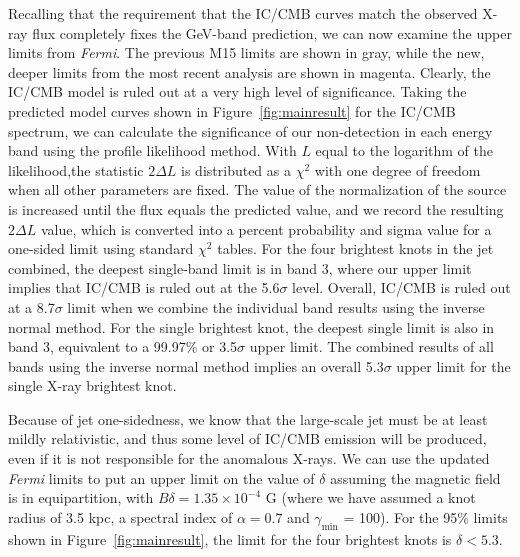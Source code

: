 \documentclass[twocolumn]{aastex61}
\begin{document}
Recalling that the requirement that the IC/CMB curves match the
observed X-ray flux completely fixes the GeV-band prediction, we can
now examine the upper limits from \emph{Fermi}. The previous M15
limits are shown in gray, while the new, deeper limits from the most
recent analysis are shown in magenta. Clearly, the IC/CMB model is
ruled out at a very high level of significance. Taking the predicted
model curves shown in Figure~\ref{fig:mainresult} for the IC/CMB
spectrum, we can calculate the significance of our non-detection in
each energy band using the profile likelihood method. With $L$ equal
to the logarithm of the likelihood,the statistic $2\Delta L$ is
distributed as a $\chi^2$ with one degree of freedom when all other
parameters are fixed. The value of the normalization of the source is
increased until the flux equals the predicted value, and we record the
resulting $2\Delta L$ value, which is converted into a percent
probability and sigma value for a one-sided limit using standard
$\chi^2$ tables. For the four brightest knots in the jet combined, the
deepest single-band limit is in band 3, where our upper limit implies
that IC/CMB is ruled out at the 5.6$\sigma$ level.  Overall, IC/CMB is
ruled out at a 8.7$\sigma$ limit when we combine the individual band
results using the inverse normal method. For the single brightest
knot, the deepest single limit is also in band 3, equivalent to a
99.97\% or 3.5$\sigma$ upper limit. The combined results of all bands
using the inverse normal method implies an overall 5.3$\sigma$ upper
limit for the single X-ray brightest knot.

Because of jet one-sidedness, we know that the large-scale jet must be
at least mildly relativistic, and thus some level of IC/CMB emission
will be produced, even if it is not responsible for the anomalous
X-rays.  We can use the updated \emph{Fermi} limits to put an upper
limit on the value of $\delta$ assuming the magnetic field is in
equipartition, with $B\delta=1.35\times10^{-4}$ G (where we have
assumed a knot radius of 3.5 kpc, a spectral index of $\alpha=0.7$ and
$\gamma_\mathrm{min}$ = 100). For the 95\% limits shown in
Figure~\ref{fig:mainresult}, the limit for the four brightest knots is
$\delta<5.3$.
\end{document}
